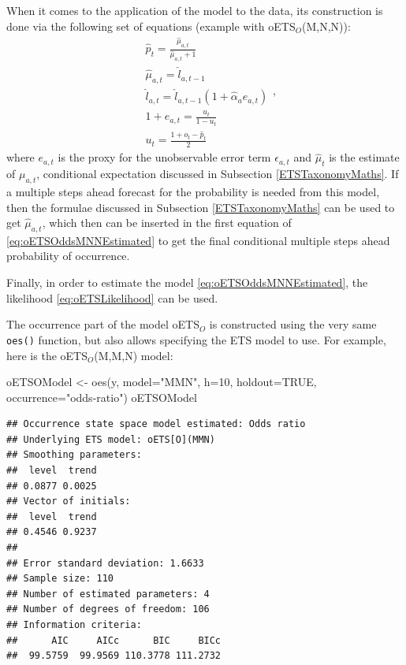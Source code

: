 \documentclass[
]{book}
\newenvironment{Shaded}{\begin{snugshade}}{\end{snugshade}}
\newcommand{\AttributeTok}[1]{\textcolor[rgb]{0.77,0.63,0.00}{#1}}
\newcommand{\ConstantTok}[1]{\textcolor[rgb]{0.00,0.00,0.00}{#1}}
\newcommand{\DecValTok}[1]{\textcolor[rgb]{0.00,0.00,0.81}{#1}}
\newcommand{\FunctionTok}[1]{\textcolor[rgb]{0.00,0.00,0.00}{#1}}
\newcommand{\NormalTok}[1]{#1}
\newcommand{\OtherTok}[1]{\textcolor[rgb]{0.56,0.35,0.01}{#1}}
\newcommand{\StringTok}[1]{\textcolor[rgb]{0.31,0.60,0.02}{#1}}
\theoremstyle{definition}
\theoremstyle{definition}
\theoremstyle{definition}
\theoremstyle{definition}
\theoremstyle{remark}
\begin{document}
When it comes to the application of the model to the data, its construction is done via the following set of equations (example with oETS\(_O\)(M,N,N)):
\begin{equation}
    \begin{aligned}
        & \hat{p}_t = \frac{\hat{\mu}_{a,t}}{\hat{\mu}_{a,t}+1} \\
        & \hat{\mu}_{a,t} = \hat{l}_{a,t-1} \\
        & \hat{l}_{a,t} = \hat{l}_{a,t-1}( 1  + \hat{\alpha}_{a} e_{a,t}) \\
        & 1+e_{a,t} = \frac{u_t}{1-u_t} \\
        & u_{t} = \frac{1 + o_t - \hat{p}_t}{2}
    \end{aligned},
    \label{eq:oETSOddsMNNEstimated}
\end{equation}
where \(e_{a,t}\) is the proxy for the unobservable error term \(\epsilon_{a,t}\) and \(\hat{\mu}_t\) is the estimate of \(\mu_{a,t}\), conditional expectation discussed in Subsection \ref{ETSTaxonomyMaths}. If a multiple steps ahead forecast for the probability is needed from this model, then the formulae discussed in Subsection \ref{ETSTaxonomyMaths} can be used to get \(\hat{\mu}_{a,t}\), which then can be inserted in the first equation of \eqref{eq:oETSOddsMNNEstimated} to get the final conditional multiple steps ahead probability of occurrence.

Finally, in order to estimate the model \eqref{eq:oETSOddsMNNEstimated}, the likelihood \eqref{eq:oETSLikelihood} can be used.

The occurrence part of the model oETS\(_O\) is constructed using the very same \texttt{oes()} function, but also allows specifying the ETS model to use. For example, here is the oETS\(_O\)(M,M,N) model:

\begin{Shaded}
\begin{Highlighting}[]
\NormalTok{oETSOModel }\OtherTok{\textless{}{-}} \FunctionTok{oes}\NormalTok{(y, }\AttributeTok{model=}\StringTok{"MMN"}\NormalTok{, }\AttributeTok{h=}\DecValTok{10}\NormalTok{, }\AttributeTok{holdout=}\ConstantTok{TRUE}\NormalTok{,}
                  \AttributeTok{occurrence=}\StringTok{"odds{-}ratio"}\NormalTok{)}
\NormalTok{oETSOModel}
\end{Highlighting}
\end{Shaded}

\begin{verbatim}
## Occurrence state space model estimated: Odds ratio
## Underlying ETS model: oETS[O](MMN)
## Smoothing parameters:
##  level  trend 
## 0.0877 0.0025 
## Vector of initials:
##  level  trend 
## 0.4546 0.9237 
## 
## Error standard deviation: 1.6633
## Sample size: 110
## Number of estimated parameters: 4
## Number of degrees of freedom: 106
## Information criteria: 
##      AIC     AICc      BIC     BICc 
##  99.5759  99.9569 110.3778 111.2732
\end{verbatim}
\end{document}
